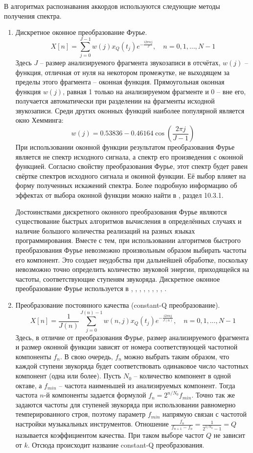 В алгоритмах распознавания аккордов используются следующие методы получения
спектра.
\begin{enumerate}
  \item Дискретное оконное преобразование Фурье.
  $$X[n] = \sum_{j=0}^{J-1} w(j)x_Q(t_j) e^{-\frac{i 2\pi nj}{J}}, \quad n=0, 1,
  \ldots, N-1$$
  Здесь $J$ -- размер анализируемого фрагмента звукозаписи в отсчётах, $w(j)$ --
  функция, отличная от нуля на некотором промежутке, не выходящем за пределы
  этого фрагмента -- оконная функция. Прямоугольная оконная функция $w(j)$,
  равная 1 только на анализируемом фрагменте и 0 -- вне его, получается
  автоматически при разделении на фрагменты исходной звукозаписи. Среди других
  оконных функций наиболее популярной является окно Хемминга:
  $$w(j) = 0.53836 - 0.46164 \cos \left( \frac{2\pi j}{J-1} \right)$$
  При использовании оконной функции результатом преобразования Фурье является не
  спектр исходного сигнала, а спектр его произведения с оконной функцией.  
  Согласно свойству преобразования Фурье, этот спектр будет равен свёртке
  спектров исходного сигнала и оконной функции. Её выбор влияет на форму
  полученных искажений спектра. Более подробную информацию об эффектах от выбора
  оконной функции можно найти в \cite{Oppenheim2006}, раздел 10.3.1.
  
  Достоинствами дискретного оконного преобразования Фурье являются существование
  быстрых алгоритмов вычисления в определённых случаях и наличие большого
  количества реализаций на разных языках программирования. Вместе с тем, при
  использовании алгоритмов быстрого преобразования Фурье невозможно произвольным
  образом выбирать частоты его компонент. Это создает неудобства при дальнейшей
  обработке, поскольку невозможно точно определить количество звуковой энергии,
  приходящейся на частоты, соответствующие ступеням звукоряда. Дискретное
  оконное преобразование Фурье используется в \cite{Sheh2003},
  \cite{Gomez2006}, \cite{Burgoyne2007}, \cite{Papadopoulos2007},
  \cite{Khadkevich2009}, \cite{Weller2009}, \cite{Mauch2010},
  \cite{Khadkevich2011}, \cite{DeHaas2012}.
  
  \item Преобразование постоянного качества (constant-Q преобразование).
  $$X[n] = \frac{1}{J(n)} \sum_{j=0}^{J(n)-1} w(n,j)x_Q(t_j) e^{-\frac{i 2\pi
  nj}{J(n)}}, \quad n=0, 1, \ldots, N-1$$ Здесь, в отличие от преобразования
  Фурье, размер анализируемого фрагмента и размер оконной функции зависят от
  номера соответствующей частотной компоненты $f_n$. В свою очередь, $f_n$ можно
  выбрать таким образом, что каждой ступени звукоряда будет соответствовать
  одинаковое число частотных компонент (одна или более). Пусть $N_0$ --
  количество компонент в одной октаве, а $f_{min}$ -- частота наименьшей из
  анализируемых компонент. Тогда частота $n$-й компоненты задается формулой
  $f_n = 2^{n/N_0} f_{min}$. Точно так же задаются частоты для ступеней
  звукоряда при использовании равномерно темперированного строя, поэтому
  параметр $f_{min}$ напрямую связан с частотой настройки музыкальных
  инструментов. Отношение $\frac{f_n}{f_{n+1} - f_n} = \frac{1}{2^{1/N_0}-1} =
  Q$ называется коэффициентом качества. При таком выборе частот $Q$ не зависит
  от $k$. Отсюда происходит название constant-Q преобразования.
  

\end{enumerate}
